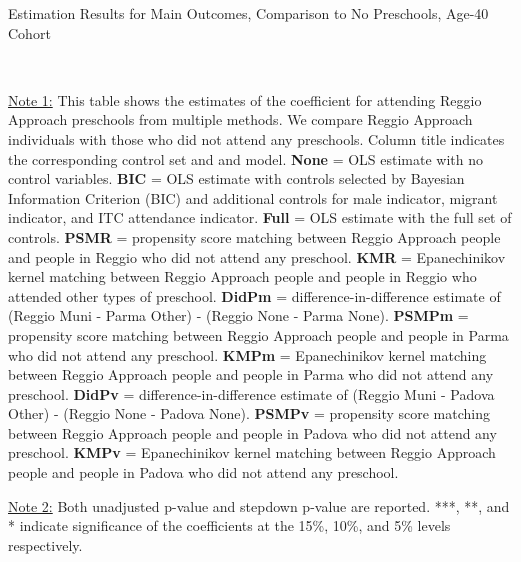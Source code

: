 \begin{table}[H] \caption{Estimation Results for Main Outcomes, Comparison to No Preschools, Age-40 Cohort} \label{ols-M-adult40-reg-nopres}
\scalebox{0.6}{}
\vspace{1ex} \\
\footnotesize\raggedright{\underline{Note 1:} This table shows the estimates of the coefficient for attending Reggio Approach preschools from multiple methods. We compare Reggio Approach individuals with those who did not attend any preschools. Column title indicates the corresponding control set and and model. \textbf{None} = OLS estimate with no control variables. \textbf{BIC} = OLS estimate with controls selected by Bayesian Information Criterion (BIC) and additional controls for male indicator, migrant indicator, and ITC attendance indicator. \textbf{Full} = OLS estimate with the full set of controls. \textbf{PSMR} =  propensity score matching between Reggio Approach people and people in Reggio who did not attend any preschool. \textbf{KMR} = Epanechinikov kernel matching between Reggio Approach people and people in Reggio who attended other types of preschool. \textbf{DidPm} = difference-in-difference estimate of (Reggio Muni - Parma Other) - (Reggio None - Parma None). \textbf{PSMPm} = propensity score matching between Reggio Approach people and people in Parma who did not attend any preschool. \textbf{KMPm} = Epanechinikov kernel matching between Reggio Approach people and people in Parma who did not attend any preschool. \textbf{DidPv} = difference-in-difference estimate of (Reggio Muni - Padova Other) - (Reggio None - Padova None). \textbf{PSMPv} = propensity score matching between Reggio Approach people and people in Padova who did not attend any preschool. \textbf{KMPv} = Epanechinikov kernel matching between Reggio Approach people and people in Padova who did not attend any preschool.} 

\footnotesize\raggedright{\underline{Note 2:} Both unadjusted p-value and stepdown p-value are reported. ***, **, and * indicate significance of the coefficients at the 15\%, 10\%, and 5\% levels respectively.}
\end{table}


